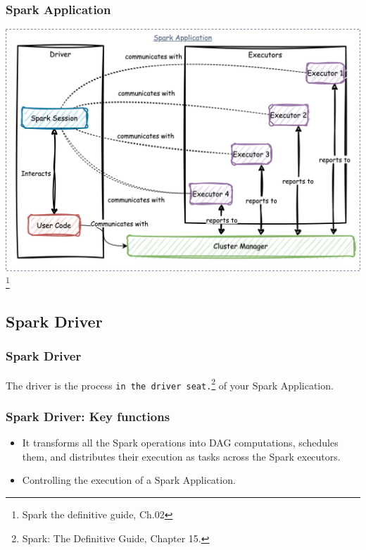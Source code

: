 \begin{frame}
    \frametitle{Spark Application}

    \includegraphics[width=\textwidth,height=.75\textheight,keepaspectratio]{./Figures/chapter-04/SparkCourse.drawio}\footnote{Spark the definitive guide, Ch.02}

\end{frame}


\subsection{Spark Driver}\label{subsec:spark-driver}

\begin{frame}
    \frametitle{Spark Driver}
    The driver is the process \texttt{\color{blue}in the driver seat.}\footnote{Spark: The Definitive Guide, Chapter 15.} of your Spark Application.

\end{frame}

\begin{frame}
    \frametitle{Spark Driver: Key functions}


    \begin{itemize}
        \item It transforms all the Spark operations into DAG computations, schedules them, and distributes their execution as tasks across the Spark executors.
        \item Controlling the execution of a Spark Application.

    \end{itemize}

\end{frame}


